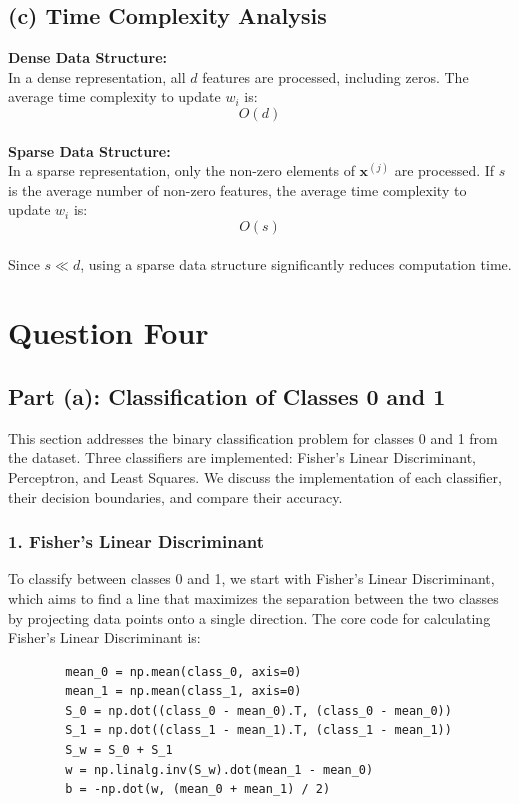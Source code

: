 \documentclass[a4paper, 11pt]{article}
\begin{document}
	\subsection*{(c) Time Complexity Analysis}
	
	\textbf{Dense Data Structure:} \\
	In a dense representation, all \(d\) features are processed, including zeros. The average time complexity to update \(w_i\) is:
	\[
	O(d)
	\]
	\\
	\textbf{Sparse Data Structure:} \\
	In a sparse representation, only the non-zero elements of \(\mathbf{x}^{(j)}\) are processed. If \(s\) is the average number of non-zero features, the average time complexity to update \(w_i\) is:
	\[
	O(s)
	\]
	\\
	Since \(s \ll d\), using a sparse data structure significantly reduces computation time.
	
	\newpage
	\section{Question Four}
	\subsection*{Part (a): Classification of Classes 0 and 1}
	
	This section addresses the binary classification problem for classes 0 and 1 from the dataset. Three classifiers are implemented: Fisher's Linear Discriminant, Perceptron, and Least Squares. We discuss the implementation of each classifier, their decision boundaries, and compare their accuracy.
	
	\subsubsection*{1. Fisher's Linear Discriminant}
	
	To classify between classes 0 and 1, we start with Fisher’s Linear Discriminant, which aims to find a line that maximizes the separation between the two classes by projecting data points onto a single direction.
	The core code for calculating Fisher’s Linear Discriminant is:
	
	\begin{verbatim}
		mean_0 = np.mean(class_0, axis=0)
		mean_1 = np.mean(class_1, axis=0)
		S_0 = np.dot((class_0 - mean_0).T, (class_0 - mean_0))
		S_1 = np.dot((class_1 - mean_1).T, (class_1 - mean_1))
		S_w = S_0 + S_1
		w = np.linalg.inv(S_w).dot(mean_1 - mean_0)
		b = -np.dot(w, (mean_0 + mean_1) / 2)
	\end{verbatim}
	
\end{document}
